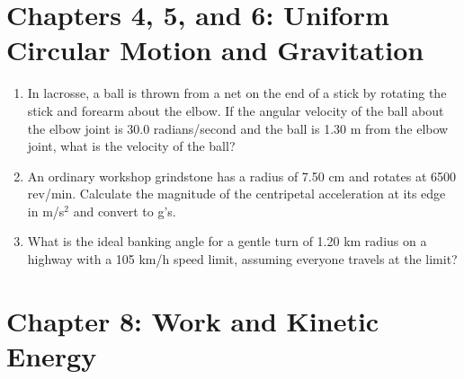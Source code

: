 \documentclass[10pt]{article}
\begin{document}
\section{Chapters 4, 5, and 6: Uniform Circular Motion and Gravitation}

\begin{enumerate}
\item In lacrosse, a ball is thrown from a net on the end of a stick by rotating the stick and forearm about the elbow. If the angular velocity of the ball about the elbow joint is 30.0 radians/second and the ball is 1.30 m from the elbow joint, what is the velocity
of the ball? \\ \vspace{1cm}
\item An ordinary workshop grindstone has a radius of 7.50 cm and rotates at 6500 rev/min.  Calculate the magnitude of the centripetal acceleration at its edge in m/s$^2$ and convert to g's. \\ \vspace{1cm}
\item What is the ideal banking angle for a gentle turn of 1.20 km radius on a highway with a 105 km/h speed limit, assuming everyone travels at the limit? \\ \vspace{1cm}
\end{enumerate}

\section{Chapter 8: Work and Kinetic Energy}
\end{document}
